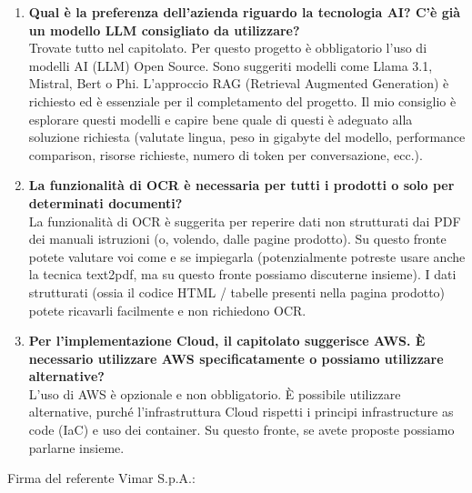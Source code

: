 \begin{enumerate}
     \item \textbf{Qual è la preferenza dell’azienda riguardo la tecnologia AI? C’è già un modello LLM consigliato da utilizzare?}\\
    Trovate tutto nel capitolato. Per questo progetto è obbligatorio l’uso di modelli AI (LLM) Open Source. Sono suggeriti modelli come Llama 3.1, Mistral, Bert o Phi. L’approccio RAG (Retrieval Augmented Generation) è richiesto ed è essenziale per il completamento del progetto. Il mio consiglio è esplorare questi modelli e capire bene quale di questi è adeguato alla soluzione richiesta (valutate lingua, peso in gigabyte del modello, performance comparison, risorse richieste, numero di token per conversazione, ecc.).

     \item \textbf{La funzionalità di OCR è necessaria per tutti i prodotti o solo per determinati documenti?}\\
    La funzionalità di OCR è suggerita per reperire dati non strutturati dai PDF dei manuali istruzioni (o, volendo, dalle pagine prodotto). Su questo fronte potete valutare voi come e se impiegarla (potenzialmente potreste usare anche la tecnica text2pdf, ma su questo fronte possiamo discuterne insieme). I dati strutturati (ossia il codice HTML / tabelle presenti nella pagina prodotto) potete ricavarli facilmente e non richiedono OCR.

     \item \textbf{Per l’implementazione Cloud, il capitolato suggerisce AWS. È necessario utilizzare AWS specificatamente o possiamo utilizzare alternative?}\\
    L’uso di AWS è opzionale e non obbligatorio. È possibile utilizzare alternative, purché l’infrastruttura Cloud rispetti i principi infrastructure as code (IaC) e uso dei container. Su questo fronte, se avete proposte possiamo parlarne insieme.

\end{enumerate}
\vspace{4cm}
\noindent Firma del referente Vimar S.p.A.: \underline{\hspace{5cm}}
